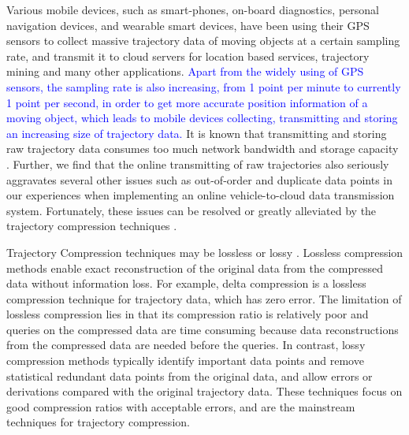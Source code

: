 Various mobile devices, such as smart-phones, on-board diagnostics, personal navigation devices, and wearable smart devices, have been using their GPS sensors to collect massive trajectory data of moving objects at a certain sampling rate, and transmit it to cloud servers for location based services, trajectory mining and many other applications.
\textcolor{blue}{Apart from the widely using of GPS sensors, the sampling rate is also increasing, \eg from 1 point per minute to currently 1 point per second, in order to get more accurate position information of a moving object, which leads to mobile devices collecting, transmitting and storing an increasing size of trajectory data.}
%
It is known that transmitting and storing raw trajectory data consumes too much network bandwidth and storage capacity \cite{Chen:Trajectory,  Chen:Fast, Meratnia:Spatiotemporal, Keogh:online, Liu:BQS, Muckell:Compression,Cao:Spatio, Popa:Spatio, Schmid:Semantic,Richter:Semantic,Long:Direction,Nibali:Trajic}.
Further, we find that the online transmitting of raw trajectories also seriously aggravates several other issues such as out-of-order and duplicate data points in our experiences when implementing an online vehicle-to-cloud data transmission system.
Fortunately, these issues can be resolved or greatly alleviated by the trajectory compression techniques \cite{Douglas:Peucker, Hershberger:Speeding, Meratnia:Spatiotemporal, Liu:BQS, Muckell:Compression, Chen:Trajectory, Chen:Fast, Keogh:online, Cao:Spatio, Shi:Survey, Richter:Semantic ,Long:Direction, Song:PRESS, Nibali:Trajic}.

Trajectory Compression techniques may be lossless or lossy \cite{Muckell:Compression}.
%
Lossless compression methods enable exact reconstruction of the original data from the compressed data without information loss. For example, delta compression \cite{Nibali:Trajic} is a lossless compression technique for trajectory data, which has zero error.
The limitation of lossless compression lies in that its compression ratio is relatively poor \cite{Nibali:Trajic} and {queries on the compressed data are time consuming because data reconstructions from the compressed data are needed before the queries}.
%
In contrast, lossy compression methods typically identify important data points and remove statistical redundant data points from the original data, and allow errors or derivations compared with the original trajectory data. 
These techniques focus on good compression ratios with acceptable errors, and are the mainstream techniques for trajectory compression.

